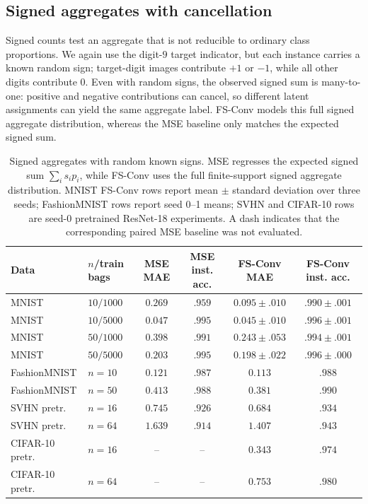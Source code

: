 \subsection{Signed aggregates with cancellation}

Signed counts test an aggregate that is not reducible to ordinary class proportions.
We again use the digit-$9$ target indicator, but each instance carries a known random sign; target-digit images contribute $+1$ or $-1$, while all other digits contribute $0$.
Even with random signs, the observed signed sum is many-to-one: positive and negative contributions can cancel, so different latent assignments can yield the same aggregate label.
FS-Conv models this full signed aggregate distribution, whereas the MSE baseline only matches the expected signed sum.

\begin{table}[t]
\centering
\scriptsize
\setlength{\tabcolsep}{3.5pt}
\caption{Signed aggregates with random known signs.  MSE regresses the expected signed sum $\sum_i s_i p_i$, while FS-Conv uses the full finite-support signed aggregate distribution.  MNIST FS-Conv rows report mean $\pm$ standard deviation over three seeds; FashionMNIST rows report seed 0--1 means; SVHN and CIFAR-10 rows are seed-0 pretrained ResNet-18 experiments.  A dash indicates that the corresponding paired MSE baseline was not evaluated.}
\label{tab:signed}
\begin{tabular}{llcccc}
\toprule
Data & $n$/train bags & MSE MAE & MSE inst. acc. & FS-Conv MAE & FS-Conv inst. acc. \\
\midrule
MNIST & $10/1000$ & $0.269$ & $.959$ & $0.095{\pm}.010$ & $.990{\pm}.001$ \\
MNIST & $10/5000$ & $0.047$ & $.995$ & $0.045{\pm}.010$ & $.996{\pm}.001$ \\
MNIST & $50/1000$ & $0.398$ & $.991$ & $0.243{\pm}.053$ & $.994{\pm}.001$ \\
MNIST & $50/5000$ & $0.203$ & $.995$ & $0.198{\pm}.022$ & $.996{\pm}.000$ \\
\midrule
FashionMNIST & $n=10$ & $0.121$ & $.987$ & $0.113$ & $.988$ \\
FashionMNIST & $n=50$ & $0.413$ & $.988$ & $0.381$ & $.990$ \\
\midrule
SVHN pretr. & $n=16$ & $0.745$ & $.926$ & $0.684$ & $.934$ \\
SVHN pretr. & $n=64$ & $1.639$ & $.914$ & $1.407$ & $.943$ \\
CIFAR-10 pretr. & $n=16$ & -- & -- & $0.343$ & $.974$ \\
CIFAR-10 pretr. & $n=64$ & -- & -- & $0.753$ & $.980$ \\
\bottomrule
\end{tabular}
\end{table}

